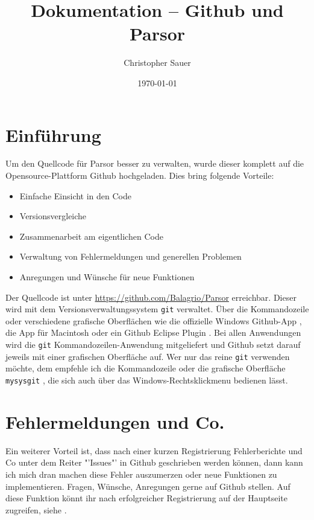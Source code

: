\documentclass[12pt, a4paper]{scrartcl}
\author{Christopher Sauer}
\title{\textbf{Dokumentation -- Github und Parsor}}
\date{\today}
\begin{document}
\onehalfspacing

\maketitle
\tableofcontents

\vspace{4em}

\listoffigures

\clearpage
\section{Einführung}

Um den Quellcode für Parsor besser zu verwalten, wurde dieser komplett auf die Opensource-Plattform Github \cite{github} hochgeladen. Dies bring folgende Vorteile:

\begin{itemize}
	\item Einfache Einsicht in den Code
	\item Versionsvergleiche
	\item Zusammenarbeit am eigentlichen Code
	\item Verwaltung von Fehlermeldungen und generellen Problemen
	\item Anregungen und Wünsche für neue Funktionen
\end{itemize}

Der Quellcode ist unter \url{https://github.com/Balagrio/Parsor} erreichbar. Dieser wird mit dem Versionsverwaltungssystem \texttt{git} \cite{git} verwaltet. Über die Kommandozeile oder verschiedene grafische Oberflächen wie die offizielle Windows Github-App \cite{git_win}, die App für Macintosh \cite{git_mac} oder ein Github Eclipse Plugin \cite{git_eclipse}. Bei allen Anwendungen wird die \texttt{git} Kommandozeilen-Anwendung mitgeliefert und Github setzt darauf jeweils mit einer grafischen Oberfläche auf. Wer nur das reine \texttt{git} verwenden möchte, dem empfehle ich die Kommandozeile oder die grafische Oberfläche \texttt{mysysgit} \cite{mysysgit}, die sich auch über das Windows-Rechtsklickmenu bedienen lässt.

\clearpage
\section{Fehlermeldungen und Co.}

Ein weiterer Vorteil ist, dass nach einer kurzen Registrierung Fehlerberichte und Co unter dem Reiter "'Issues"' in Github geschrieben werden können, dann kann ich mich dran machen diese Fehler auszumerzen oder neue Funktionen zu implementieren. Fragen, Wünsche, Anregungen gerne auf Github stellen. Auf diese Funktion könnt ihr nach erfolgreicher Registrierung auf der Hauptseite \cite{github} zugreifen, siehe . \\
\end{document}
